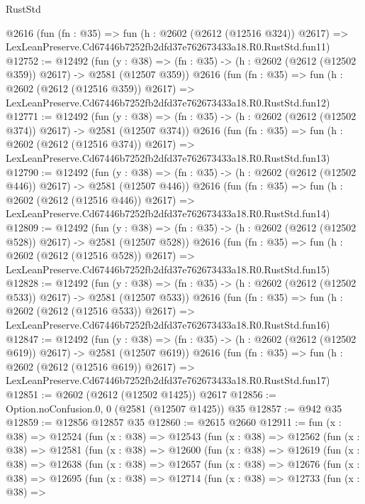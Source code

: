 \begin{lexlean}{RustStd}
\begin{coremodule}
    @2616
    (fun (fn : @35) =>
    fun (h : @2602 (@2612 (@12516 @324)) @2617) =>
    LexLeanPreserve.Cd67446b7252fb2dfd37e762673433a18.R0.RustStd.fun11)
@12752 := @12492
    (fun (y : @38) => (fn : @35) -> (h : @2602 (@2612 (@12502 @359)) @2617) -> @2581 (@12507 @359))
    @2616
    (fun (fn : @35) =>
    fun (h : @2602 (@2612 (@12516 @359)) @2617) =>
    LexLeanPreserve.Cd67446b7252fb2dfd37e762673433a18.R0.RustStd.fun12)
@12771 := @12492
    (fun (y : @38) => (fn : @35) -> (h : @2602 (@2612 (@12502 @374)) @2617) -> @2581 (@12507 @374))
    @2616
    (fun (fn : @35) =>
    fun (h : @2602 (@2612 (@12516 @374)) @2617) =>
    LexLeanPreserve.Cd67446b7252fb2dfd37e762673433a18.R0.RustStd.fun13)
@12790 := @12492
    (fun (y : @38) => (fn : @35) -> (h : @2602 (@2612 (@12502 @446)) @2617) -> @2581 (@12507 @446))
    @2616
    (fun (fn : @35) =>
    fun (h : @2602 (@2612 (@12516 @446)) @2617) =>
    LexLeanPreserve.Cd67446b7252fb2dfd37e762673433a18.R0.RustStd.fun14)
@12809 := @12492
    (fun (y : @38) => (fn : @35) -> (h : @2602 (@2612 (@12502 @528)) @2617) -> @2581 (@12507 @528))
    @2616
    (fun (fn : @35) =>
    fun (h : @2602 (@2612 (@12516 @528)) @2617) =>
    LexLeanPreserve.Cd67446b7252fb2dfd37e762673433a18.R0.RustStd.fun15)
@12828 := @12492
    (fun (y : @38) => (fn : @35) -> (h : @2602 (@2612 (@12502 @533)) @2617) -> @2581 (@12507 @533))
    @2616
    (fun (fn : @35) =>
    fun (h : @2602 (@2612 (@12516 @533)) @2617) =>
    LexLeanPreserve.Cd67446b7252fb2dfd37e762673433a18.R0.RustStd.fun16)
@12847 := @12492
    (fun (y : @38) => (fn : @35) -> (h : @2602 (@2612 (@12502 @619)) @2617) -> @2581 (@12507 @619))
    @2616
    (fun (fn : @35) =>
    fun (h : @2602 (@2612 (@12516 @619)) @2617) =>
    LexLeanPreserve.Cd67446b7252fb2dfd37e762673433a18.R0.RustStd.fun17)
@12851 := @2602 (@2612 (@12502 @1425)) @2617
@12856 := Option.noConfusion.{0, 0} (@2581 (@12507 @1425)) @35
@12857 := @942 @35
@12859 := @12856 @12857 @35
@12860 := @2615 @2660
@12911 := fun (x : @38) =>
  @12524
    (fun (x : @38) =>
    @12543
      (fun (x : @38) =>
      @12562
        (fun (x : @38) =>
        @12581
          (fun (x : @38) =>
          @12600
            (fun (x : @38) =>
            @12619
              (fun (x : @38) =>
              @12638
                (fun (x : @38) =>
                @12657
                  (fun (x : @38) =>
                  @12676
                    (fun (x : @38) =>
                    @12695
                      (fun (x : @38) =>
                      @12714
                        (fun (x : @38) =>
                        @12733
                          (fun (x : @38) =>

\end{coremodule}
\end{lexlean}
